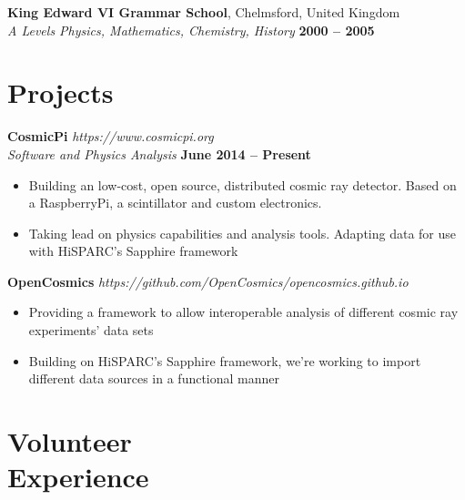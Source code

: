\documentclass[margin,line]{resume}
\begin{document}
\begin{resume}
    \textbf{King Edward VI Grammar School}, Chelmsford, United Kingdom  \vspace{2mm}\\\vspace{1mm}%
    \textsl{A Levels Physics, Mathematics, Chemistry, History} \hfill \textbf{2000 -- 2005}\vspace{-3mm}\\\vspace{-1mm}%
\vspace{-1.5mm}

    \section{\mysidestyle Projects}


    \textbf{CosmicPi}  \hfill \textsl{https://www.cosmicpi.org}\\\vspace{1mm}%
    \textsl{Software and Physics Analysis} \hfill \textbf{June 2014 -- Present}\\
    \begin{itemize}
    \item{Building an low-cost, open source, distributed cosmic ray detector. Based on a RaspberryPi, a scintillator and custom electronics.}
    \item{Taking lead on physics capabilities and analysis tools. Adapting data for use with HiSPARC's Sapphire framework}
    \end{itemize}

    \textbf{OpenCosmics} \hfill \textsl{https://github.com/OpenCosmics/opencosmics.github.io}\\\vspace{1mm}%
    \begin{itemize}
    \item{Providing a framework to allow interoperable analysis of different cosmic ray experiments' data sets}
    \item{Building on HiSPARC's Sapphire framework, we're working to import different data sources in a functional manner}
    \end{itemize}

    \section{\mysidestyle Volunteer\\Experience}



\end{resume}
\end{document}

